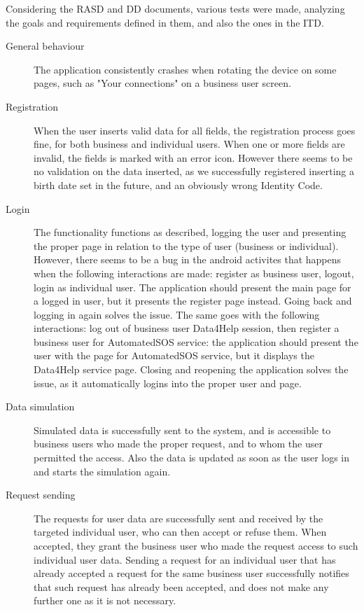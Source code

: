 \documentclass[../main.tex]{subfiles}
\begin{document}
    Considering the RASD and DD documents, various tests were made, analyzing the goals and requirements defined in them, and also the ones in the ITD.

    \begin{description}
        \item [General behaviour] The application consistently crashes when rotating the device on some pages, such as "Your connections" on a business user screen.
        \item [Registration] When the user inserts valid data for all fields, the registration process goes fine, for both business and individual users. When one or more fields are invalid, the fields is marked with an error icon. However there seems to be no validation on the data inserted, as we successfully registered inserting a birth date set in the future, and an obviously wrong Identity Code.
        \item [Login] The functionality functions as described, logging the user and presenting the proper page in relation to the type of user (business or individual). However, there seems to be a bug in the android activites that happens when the following interactions are made: register as business user, logout, login as individual user. The application should present the main page for a logged in user, but it presents the register page instead. Going back and logging in again solves the issue. The same goes with the following interactions: log out of business user Data4Help session, then register a business user for AutomatedSOS service: the application should present the user with the page for AutomatedSOS service, but it displays the Data4Help service page. Closing and reopening the application solves the issue, as it automatically logins into the proper user and page.
        \item [Data simulation] Simulated data is successfully sent to the system, and is accessible to business users who made the proper request, and to whom the user permitted the access. Also the data is updated as soon as the user logs in and starts the simulation again.
        \item [Request sending] The requests for user data are successfully sent and received by the targeted individual user, who can then accept or refuse them. When accepted, they grant the business user who made the request access to such individual user data. Sending a request for an individual user that has already accepted a request for the same business user successfully notifies that such request has already been accepted, and does not make any further one as it is not necessary.

\end{description}
\end{document}
